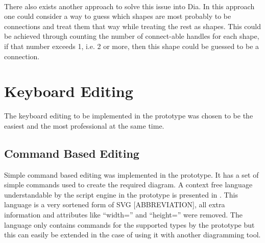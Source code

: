 \begin{itemize}
\paragraph{}
There also exists another approach to solve this issue into Dia. In this approach one could consider a way to guess which shapes are most probably to be connections and treat them that way while treating the rest as shapes. This could be achieved through counting the number of connect-able handles for each shape, if that number exceeds 1, i.e. 2 or more, then this shape could be guessed to be a connection.
\end{itemize}


\section{Keyboard Editing}
The keyboard editing to be implemented in the prototype was chosen to be the easiest and the most professional at the same time. 
\subsection{Command Based Editing}
Simple command based editing was implemented in the prototype. It has a set of simple commands used to create the required diagram. A context free language understandable by the script engine in the prototype is presented in . This language is a very sortened form of SVG [ABBREVIATION], all extra information and attributes like ``width='' and ``height='' were removed. The language only contains commands for the supported types by the prototype but this can easily be extended in the case of using it with another diagramming tool.

